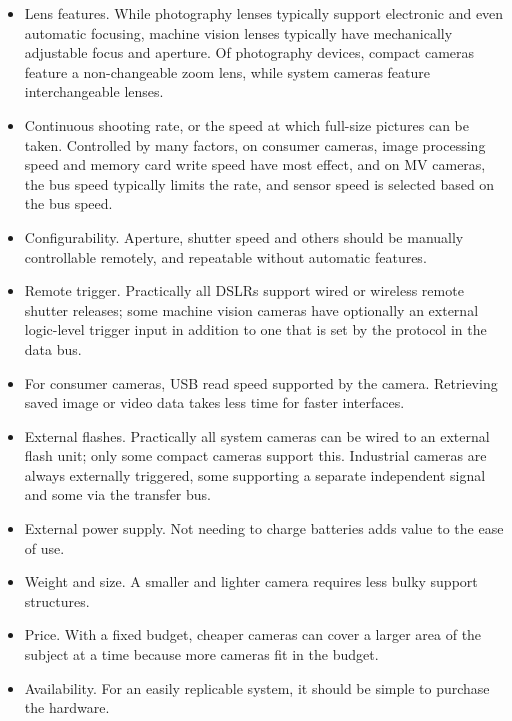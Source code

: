 \begin{itemize}
	\item Lens features.
		While photography lenses typically support electronic and even automatic focusing, machine vision lenses typically have mechanically adjustable focus and aperture.
		Of photography devices, compact cameras feature a non-changeable zoom lens, while system cameras feature interchangeable lenses.

	\item Continuous shooting rate, or the speed at which full-size pictures can be taken.
		Controlled by many factors, on consumer cameras, image processing speed and memory card write speed have most effect, and on MV cameras, the bus speed typically limits the rate, and sensor speed is selected based on the bus speed.

	\item Configurability.
		Aperture, shutter speed and others should be manually controllable remotely, and repeatable without automatic features.

	\item Remote trigger.
		Practically all DSLRs support wired or wireless remote shutter releases; some machine vision cameras have optionally an external logic-level trigger input in addition to one that is set by the protocol in the data bus. %

	\item For consumer cameras, USB read speed supported by the camera.
		Retrieving saved image or video data takes less time for faster interfaces.

	\item External flashes.
		Practically all system cameras can be wired to an external flash unit; only some compact cameras support this.
		Industrial cameras are always externally triggered, some supporting a separate independent signal and some via the transfer bus.

	\item External power supply.
		Not needing to charge batteries adds value to the ease of use.

	\item Weight and size.
		A smaller and lighter camera requires less bulky support structures.

	\item Price.
		With a fixed budget, cheaper cameras can cover a larger area of the subject at a time because more cameras fit in the budget.

	\item Availability.
		For an easily replicable system, it should be simple to purchase the hardware.
\end{itemize}

